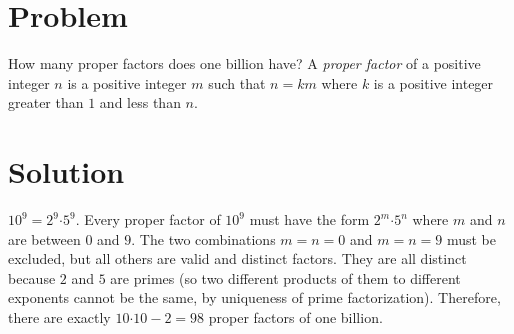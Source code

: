\documentclass[11pt,a4paper]{report}
\theoremstyle{plain}
\theoremstyle{definition}
\theoremstyle{remark}
\begin{document}
\section*{Problem}
How many proper factors does one billion have?  A \emph{proper factor} of a positive integer $n$ is a positive integer $m$ such that $n = km$ where $k$ is a positive integer greater than $1$ and less than $n$.

\section*{Solution}
$10^9 = 2^9 \mathord{\cdot} 5^9.$  Every proper factor of $10^9$ must have the form $2^m \mathord{\cdot} 5^n$ where $m$ and $n$ are between $0$ and $9$.  The two combinations $m = n = 0$ and $m = n = 9$ must be excluded, but all others are valid and distinct factors.  They are all distinct because $2$ and $5$ are primes (so two different products of them to different exponents cannot be the same, by uniqueness of prime factorization).  Therefore, there are exactly $10 \mathord{\cdot} 10 - 2 = 98$ proper factors of one billion.
\end{document}
